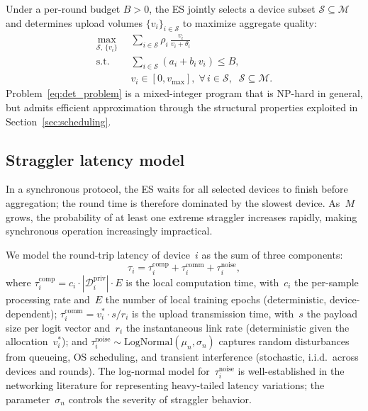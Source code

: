 \documentclass[a4paper,fleqn]{cas-dc}
\newcommand{\Dpriv}{\mathcal{D}_i^{\mathrm{priv}}}
\newcommand{\Mset}{\mathcal{M}}
\newcommand{\Sset}{\mathcal{S}}
\newcommand{\vmax}{v_{\max}}
\begin{document}
	Under a per-round budget $B > 0$, the ES jointly selects a device
	subset $\Sset \subseteq \Mset$ and determines upload volumes
	$\{v_i\}_{i \in \Sset}$ to maximize aggregate quality:
	\begin{subequations}\label{eq:det_problem}
		\begin{align}
			\max_{\Sset,\,\{v_i\}} \;\;
			& \sum_{i \in \Sset} \rho_i \,\frac{v_i}{v_i + \theta_i}
			\label{eq:det_obj} \\
			\text{s.t.} \;\;
			& \sum_{i \in \Sset}(a_i + b_i \, v_i) \leq B,
			\label{eq:det_budget} \\
			& v_i \in [0, \vmax],\; \forall\, i \in \Sset,
			\;\; \Sset \subseteq \Mset.
			\label{eq:det_bound}
		\end{align}
	\end{subequations}
	Problem~\eqref{eq:det_problem} is a mixed-integer program that is
	NP-hard in general, but admits efficient approximation through the
	structural properties exploited in Section~\ref{sec:scheduling}.
	
	\subsection{Straggler latency model}\label{sec:straggler}
	
	In a synchronous protocol, the ES waits for all selected devices to
	finish before aggregation; the round time is therefore dominated by
	the slowest device.  As~$M$ grows, the probability of at least one
	extreme straggler increases rapidly, making synchronous operation
	increasingly impractical.
	
	We model the round-trip latency of device~$i$ as the sum of three
	components:
	\begin{equation}\label{eq:latency}
		\tau_i = \tau_i^{\mathrm{comp}} + \tau_i^{\mathrm{comm}}
		+ \tau_i^{\mathrm{noise}},
	\end{equation}
	where
	$\tau_i^{\mathrm{comp}} = c_i \cdot |\Dpriv| \cdot E$ is the local
	computation time, with~$c_i$ the per-sample processing rate and~$E$
	the number of local training epochs (deterministic,
	device-dependent);
	$\tau_i^{\mathrm{comm}} = v_i^* \cdot s / r_i$ is the upload
	transmission time, with~$s$ the payload size per logit vector
	and~$r_i$ the instantaneous link rate (deterministic given the
	allocation~$v_i^*$); and
	$\tau_i^{\mathrm{noise}} \sim \mathrm{LogNormal}(\mu_n, \sigma_n)$
	captures random disturbances from queueing, OS scheduling, and
	transient interference (stochastic, i.i.d.\ across devices and
	rounds).  The log-normal model for~$\tau_i^{\mathrm{noise}}$ is
	well-established in the networking literature for representing
	heavy-tailed latency variations; the parameter~$\sigma_n$ controls
	the severity of straggler behavior.
	
\end{document}
